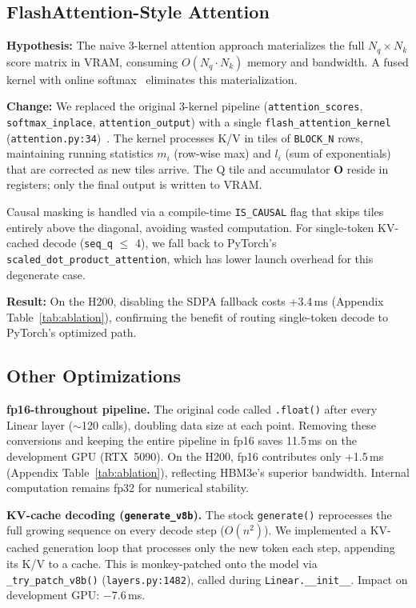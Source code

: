 \documentclass{article}
\begin{document}
\subsection{FlashAttention-Style Attention}

\textbf{Hypothesis:} The naive 3-kernel attention approach materializes the full $N_q \times N_k$ score matrix in VRAM, consuming $O(N_q \cdot N_k)$ memory and bandwidth.  A fused kernel with online softmax~\citep{milakov2018online} eliminates this materialization.

\textbf{Change:} We replaced the original 3-kernel pipeline (\texttt{attention\_scores}, \texttt{softmax\_inplace}, \texttt{attention\_output}) with a single \texttt{flash\_attention\_kernel} (\texttt{attention.py:34})~\citep{dao2023flashattention2fasterattentionbetter, ringlein2025anatomy}.  The kernel processes K/V in tiles of \texttt{BLOCK\_N} rows, maintaining running statistics $m_i$ (row-wise max) and $l_i$ (sum of exponentials) that are corrected as new tiles arrive.  The Q tile and accumulator $\mathbf{O}$ reside in registers; only the final output is written to VRAM.

Causal masking is handled via a compile-time \texttt{IS\_CAUSAL} flag that skips tiles entirely above the diagonal, avoiding wasted computation.  For single-token KV-cached decode (\texttt{seq\_q} $\leq$ 4), we fall back to PyTorch's \texttt{scaled\_dot\_product\_attention}, which has lower launch overhead for this degenerate case.

\textbf{Result:} On the H200, disabling the SDPA fallback costs +3.4\,ms (Appendix Table~\ref{tab:ablation}), confirming the benefit of routing single-token decode to PyTorch's optimized path.

\subsection{Other Optimizations}

\textbf{fp16-throughout pipeline.}
The original code called \texttt{.float()} after every Linear layer ($\sim$120 calls), doubling data size at each point.  Removing these conversions and keeping the entire pipeline in fp16 saves 11.5\,ms on the development GPU (RTX~5090).  On the H200, fp16 contributes only +1.5\,ms (Appendix Table~\ref{tab:ablation}), reflecting HBM3e's superior bandwidth.  Internal computation remains fp32 for numerical stability.

\textbf{KV-cache decoding (\texttt{generate\_v8b}).}
The stock \texttt{generate()} reprocesses the full growing sequence on every decode step ($O(n^2)$).  We implemented a KV-cached generation loop that processes only the new token each step, appending its K/V to a cache.  This is monkey-patched onto the model via \texttt{\_try\_patch\_v8b()} (\texttt{layers.py:1482}), called during \texttt{Linear.\_\_init\_\_}.  Impact on development GPU: $-$7.6\,ms.
\end{document}
